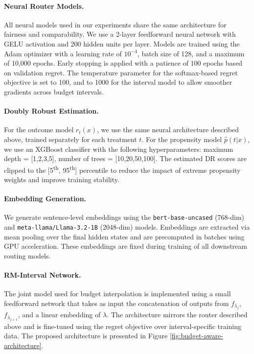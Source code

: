 \documentclass{article}
\theoremstyle{remark}
\begin{document}
\paragraph{Neural Router Models.}  
All neural models used in our experiments share the same architecture for fairness and comparability. We use a 2-layer feedforward neural network with GELU activation and 200 hidden units per layer. Models are trained using the Adam optimizer with a learning rate of \(10^{-4}\), batch size of 128, and a maximum of 10,000 epochs. Early stopping is applied with a patience of 100 epochs based on validation regret. The temperature parameter for the softmax-based regret objective is set to 100, and to 1000 for the interval model to allow smoother gradients across budget intervals.

\paragraph{Doubly Robust Estimation.}  
For the outcome model \(\hat{r}_t(x)\), we use the same neural architecture described above, trained separately for each treatment \(t\). For the propensity model \(\hat{p}(t|x)\), we use an XGBoost classifier with the following hyperparameters: maximum depth = [1,2,3,5], number of trees = [10,20,50,100]. The estimated DR scores are clipped to the [5\textsuperscript{th}, 95\textsuperscript{th}] percentile to reduce the impact of extreme propensity weights and improve training stability.

\paragraph{Embedding Generation.}  
We generate sentence-level embeddings using the \texttt{bert-base-uncased} (768-dim) and \texttt{meta-llama/Llama-3.2-1B} (2048-dim) models. Embeddings are extracted via mean pooling over the final hidden states and are precomputed in batches using GPU acceleration. These embeddings are fixed during training of all downstream routing models.

\paragraph{RM-Interval Network.}  
The joint model used for budget interpolation is implemented using a small feedforward network that takes as input the concatenation of outputs from \(f_{\lambda_j}\), \(f_{\lambda_{j+1}}\), and a linear embedding of \(\lambda\). The architecture mirrors the router described above and is fine-tuned using the regret objective over interval-specific training data. The proposed architecture is presented in Figure \ref{fig:budget-aware-architecture}.
\end{document}
